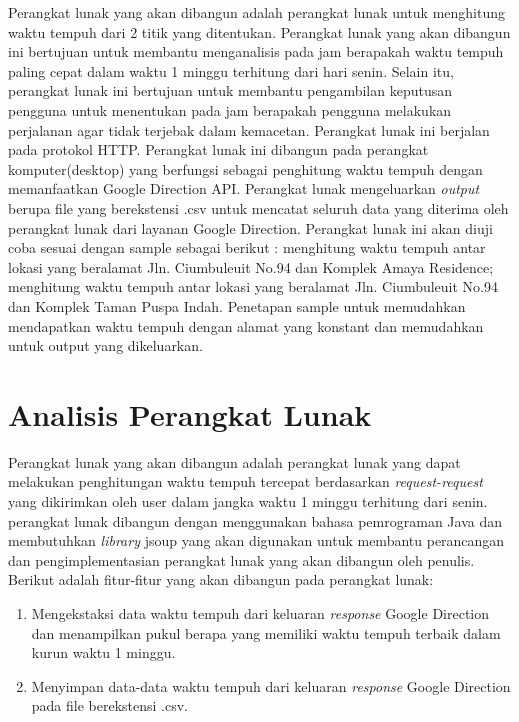 Perangkat lunak yang akan dibangun adalah perangkat lunak untuk menghitung waktu tempuh dari 2 titik yang ditentukan. Perangkat lunak yang akan dibangun ini bertujuan untuk membantu menganalisis pada jam berapakah waktu tempuh paling cepat dalam waktu 1 minggu terhitung dari hari senin. Selain itu, perangkat lunak ini bertujuan untuk membantu pengambilan keputusan pengguna untuk menentukan pada jam berapakah pengguna melakukan perjalanan agar tidak terjebak dalam kemacetan. Perangkat lunak ini berjalan pada protokol HTTP. Perangkat lunak ini dibangun pada perangkat komputer(desktop) yang berfungsi sebagai penghitung waktu tempuh dengan memanfaatkan Google Direction API. Perangkat lunak mengeluarkan \textit{output} berupa file yang berekstensi .csv untuk mencatat seluruh data yang diterima oleh perangkat lunak dari layanan Google Direction.
Perangkat lunak ini akan diuji coba sesuai dengan sample sebagai berikut :
menghitung  waktu tempuh antar lokasi yang beralamat Jln. Ciumbuleuit No.94 dan Komplek Amaya Residence; menghitung  waktu tempuh antar lokasi yang beralamat Jln. Ciumbuleuit No.94 dan Komplek Taman Puspa Indah. Penetapan sample untuk memudahkan mendapatkan waktu tempuh dengan alamat yang konstant dan memudahkan untuk output yang dikeluarkan.
						
\section{Analisis Perangkat Lunak}
\label{sec:analisispl}

Perangkat lunak yang akan dibangun adalah perangkat lunak yang dapat melakukan penghitungan waktu tempuh tercepat berdasarkan \textit{request-request} yang dikirimkan oleh user dalam jangka waktu 1 minggu terhitung dari senin. perangkat lunak dibangun dengan menggunakan bahasa pemrograman Java dan membutuhkan \textit{library} jsoup yang akan digunakan untuk membantu perancangan dan pengimplementasian perangkat lunak yang akan dibangun oleh penulis. Berikut adalah fitur-fitur yang akan dibangun pada perangkat lunak:

\begin{enumerate}
	\item Mengekstaksi data waktu tempuh dari keluaran \textit{response} Google Direction dan menampilkan pukul berapa yang memiliki waktu tempuh terbaik dalam kurun waktu 1 minggu.
	\item Menyimpan data-data waktu tempuh dari keluaran \textit{response} Google Direction pada file berekstensi .csv.
\end{enumerate}
 
